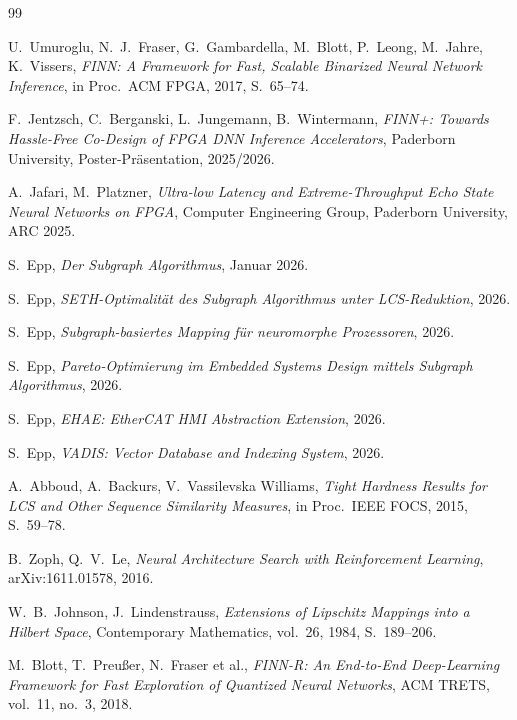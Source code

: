 ﻿\documentclass[a4paper,12pt]{article}
\theoremstyle{definition}
\begin{document}
\begin{thebibliography}{99}

  U.~Umuroglu, N.~J.~Fraser, G.~Gambardella, M.~Blott, P.~Leong, M.~Jahre, K.~Vissers,
  \textit{FINN: A Framework for Fast, Scalable Binarized Neural Network Inference},
  in Proc.\ ACM FPGA, 2017, S.~65--74.

  F.~Jentzsch, C.~Berganski, L.~Jungemann, B.~Wintermann,
  \textit{FINN+: Towards Hassle-Free Co-Design of FPGA DNN Inference Accelerators},
  Paderborn University, Poster-Präsentation, 2025/2026.

  A.~Jafari, M.~Platzner,
  \textit{Ultra-low Latency and Extreme-Throughput Echo State Neural Networks on FPGA},
  Computer Engineering Group, Paderborn University, ARC 2025.

  S.~Epp,
  \textit{Der Subgraph Algorithmus}, Januar 2026.

  S.~Epp,
  \textit{SETH-Optimalität des Subgraph Algorithmus unter LCS-Reduktion}, 2026.

  S.~Epp,
  \textit{Subgraph-basiertes Mapping für neuromorphe Prozessoren}, 2026.

  S.~Epp,
  \textit{Pareto-Optimierung im Embedded Systems Design mittels Subgraph Algorithmus}, 2026.

  S.~Epp,
  \textit{EHAE: EtherCAT HMI Abstraction Extension}, 2026.

  S.~Epp,
  \textit{VADIS: Vector Database and Indexing System}, 2026.

  A.~Abboud, A.~Backurs, V.~Vassilevska Williams,
  \textit{Tight Hardness Results for LCS and Other Sequence Similarity Measures},
  in Proc.\ IEEE FOCS, 2015, S.~59--78.

  B.~Zoph, Q.~V.~Le,
  \textit{Neural Architecture Search with Reinforcement Learning},
  arXiv:1611.01578, 2016.

  W.~B.~Johnson, J.~Lindenstrauss,
  \textit{Extensions of Lipschitz Mappings into a Hilbert Space},
  Contemporary Mathematics, vol.~26, 1984, S.~189--206.

  M.~Blott, T.~Preußer, N.~Fraser et al.,
  \textit{FINN-R: An End-to-End Deep-Learning Framework for Fast Exploration
  of Quantized Neural Networks},
  ACM TRETS, vol.~11, no.~3, 2018.


\end{thebibliography}
\end{document}
